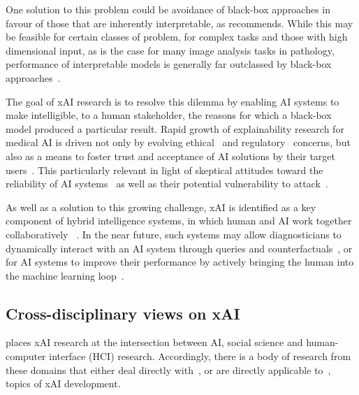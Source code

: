 \documentclass[final,5p,times,twocolumn,hyphens]{elsarticle}
\begin{document}
One solution to this problem could be avoidance of black-box approaches in favour of those that are inherently interpretable, as \citet{Rudin:2019:interpretable} recommends. While this may be feasible for certain classes of problem, for complex tasks and those with high dimensional input, as is the case for many image analysis tasks in pathology, performance of interpretable models is generally far outclassed by black-box approaches~\cite{arrieta2020explainable, Holzinger:2020:explainable}.

The goal of xAI research is to resolve this dilemma by enabling AI systems to make intelligible, to a human stakeholder, the reasons for which a black-box model produced a particular result. Rapid growth of explainability research for medical AI is driven not only by evolving ethical~\cite{MuellerEtAl:2021:TenCommandments} and regulatory~\cite{Schneeberger:2020:legalAI} concerns, but also as a means to foster trust and acceptance of AI solutions by their target users~\cite{GuidottiPedreschi:2019:Survey, ProsperiEtAl:2020:CausalHealth, Ferrario:trustmedicalai, gaube:trustmedicalai:2021, kastner2021relation}. This particularly relevant in light of skeptical attitudes toward the reliability of AI systems~\cite{quinn:trustmedicalai:2020, tosun_histomapr_2020} as well as their potential vulnerability to attack~\cite{finlayson2019adversarial, foote2021now}.

As well as a solution to this growing challenge, xAI is identified as a key component of hybrid intelligence systems, in which human and AI work together collaboratively ~\cite{hemmer2021human}. In the near future, such systems may allow diagnosticians to dynamically interact with an AI system through queries and counterfactuals~\cite{HolzingerEtAl:2021:GraphFusion, tosun_histomapr_2020}, or for AI systems to improve their performance by actively bringing the human into the machine learning loop~\cite{Holzinger:2020:explainable}.

\subsection{Cross-disciplinary views on xAI}

\citet{miller2019explanation} places xAI research at the intersection between AI, social science and human-computer interface (HCI) research. Accordingly, there is a body of research from these domains that either deal directly with~\cite{abdul2020cogam, holzinger2013human}, or are directly applicable to~\cite{nielsen2005ten}, topics of xAI development.
\end{document}
